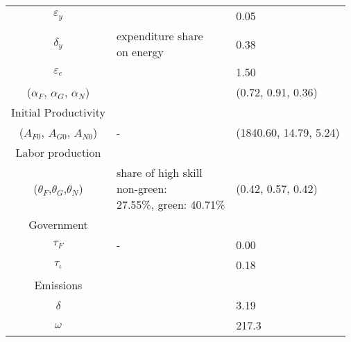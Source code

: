 \begin{table}[h!]
\begin{center}
{\begin{tabular}{c|ll}
 			\hline
 			$\varepsilon_y$&\cite{Fried2018ClimateAnalysis}&0.05\\			
 			$\delta_y$&\makecell[l]{expenditure share \\ on energy \citep{EIAEnergy}}&0.38\\	
 			$\varepsilon_e$&&1.50\\	
			($\alpha_F$, $\alpha_G$, $\alpha_N$)&\cite{Fried2018ClimateAnalysis} &(0.72, 0.91, 0.36)\\
 			\hline
 			\hline
 			Initial Productivity&\multicolumn{2}{c}{}\\
 			\hline
 			
 			\hline
 			($A_{F0}$, $A_{G0}$, $A_{N0}$)&- &(1840.60, 14.79, 5.24)  \\
 			\hline \hline
 				Labor production&\multicolumn{2}{c}{}\\
 			\hline 
 			
 			\hline
 			($\theta_F$,$\theta_G$,$\theta_N$)&\makecell[l]{share of high skill\\ non-green: \\27.55\%, green: 40.71\% \citep{Consoli2016DoCapital} }& (0.42, 0.57, 0.42)\\
 			\hline
 			\hline
 			Government&\multicolumn{2}{c}{}\\
 			\hline
 			
 			\hline
 			$\tau_F$&- &0.00\\
 			$\tau_\iota$&\cite{Heathcote2017OptimalFramework} &0.18\\
 			\hline	
 			\hline
 			Emissions&\multicolumn{2}{c}{}\\
 			\hline
 			
 			\hline
 			$\delta$& \makecell[l]{\cite{EPAems}}&3.19\\
 			$\omega$& \cite{EPAems}&217.3\\
 			\hline \hline
 		\end{tabular}
 	}
 	\end{center}
 \end{table}
 
 
